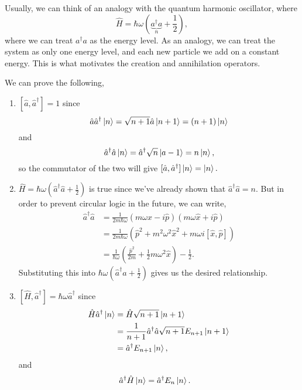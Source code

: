 \documentclass{article}
\numberwithin{equation}{section}
\begin{document}
Usually, we can think of an analogy with the quantum harmonic oscillator, where 
\begin{equation}
    \hat{H} = \hbar\omega\left(\underbrace{a^\dagger a}_{n} + \frac{1}{2}\right),
\end{equation}
where we can treat $a^\dagger a$ as the energy level. As an analogy, we can treat the system as only one energy level, and each new particle we add on a constant energy. This is what motivates the creation and annihilation operators.
\begin{problem}[3.3.1]
    We can prove the following,
    \begin{enumerate}[label=(\alph*)]
        \item $[\hat{a},\hat{a}^\dagger] = 1$ since $$\hat{a}\hat{a}^\dagger \ket{n} = \sqrt{n+1}\hat{a}\ket{n+1} = (n+1)\ket{n}$$ and 
        $$\hat{a}^\dagger \hat{a}\ket{n} = \hat{a}^\dagger\sqrt{n}\ket{a-1} = n\ket{n},$$ so the commutator of the two will give $[\hat{a},\hat{a}^\dagger]\ket{n} = \ket{n}.$
        \item $\hat{H} = \hbar\omega\left(\hat{a}^\dagger\hat{a} + \frac{1}{2}\right)$ is true since we've already shown that $\hat{a}^\dagger\hat{a} = n.$ But in order to prevent circular logic in the future, we can write,
        \begin{align*}
            \hat{a}^\dagger\hat{a} &= \frac{1}{2m\hbar\omega}\left(m\omega \hat{x}-i\hat{p}\right)\left(m\omega \hat{x}+i\hat{p}\right) \\ 
            &= \frac{1}{2m\hbar\omega}\left(\hat{p}^2 + m^2\omega^2\hat{x}^2 + m\omega i [\hat{x},\hat{p}]\right) \\
            &= \frac{1}{\hbar\omega}\left(\frac{\hat{p}^2}{2m} + \frac{1}{2}m\omega^2\hat{x}\right) - \frac{1}{2}.
        \end{align*}
        Substituting this into $\hbar\omega(\hat{a}^\dagger\hat{a} + \frac{1}{2})$ gives us the desired relationship.
        \item $[\hat{H},\hat{a}^\dagger]=\hbar\omega\hat{a}^\dagger$ since
        \begin{align*}
            \hat{H}\hat{a}^\dagger \ket{n} &= \hat{H}\sqrt{n+1}\ket{n+1}\\ 
            &= \frac{1}{n+1}\hat{a}^\dagger \hat{a}\sqrt{n+1}E_{n+1}\ket{n+1} \\ 
            &= \hat{a}^\dagger E_{n+1}\ket{n},
        \end{align*}
        and 
        \begin{align*}
            \hat{a}^\dagger \hat{H}\ket{n} &= \hat{a}^\dagger E_n \ket{n}.

\end{align*}
\end{enumerate}
\end{problem}
\end{document}
